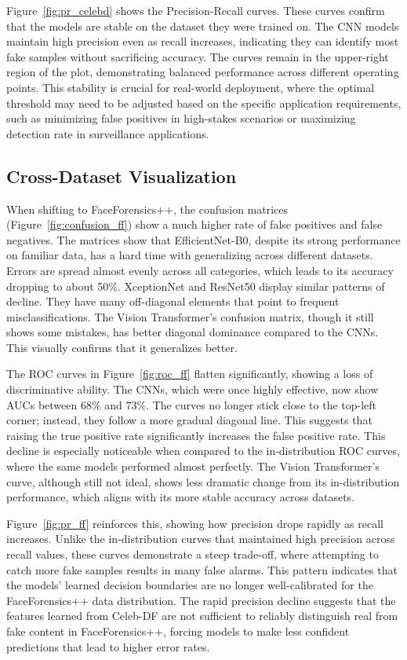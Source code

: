 \documentclass[conference]{IEEEtran}
\begin{document}
Figure~\ref{fig:pr_celebd} shows the Precision-Recall curves. These curves confirm that the models are stable on the dataset they were trained on. The CNN models maintain high precision even as recall increases, indicating they can identify most fake samples without sacrificing accuracy. The curves remain in the upper-right region of the plot, demonstrating balanced performance across different operating points. This stability is crucial for real-world deployment, where the optimal threshold may need to be adjusted based on the specific application requirements, such as minimizing false positives in high-stakes scenarios or maximizing detection rate in surveillance applications.

\subsection{Cross-Dataset Visualization}
When shifting to FaceForensics++, the confusion matrices (Figure~\ref{fig:confusion_ff}) show a much higher rate of false positives and false negatives. The matrices show that EfficientNet-B0, despite its strong performance on familiar data, has a hard time with generalizing across different datasets. Errors are spread almost evenly across all categories, which leads to its accuracy dropping to about 50\%. XceptionNet and ResNet50 display similar patterns of decline. They have many off-diagonal elements that point to frequent misclassifications. The Vision Transformer's confusion matrix, though it still shows some mistakes, has better diagonal dominance compared to the CNNs. This visually confirms that it generalizes better.

The ROC curves in Figure~\ref{fig:roc_ff} flatten significantly, showing a loss of discriminative ability. The CNNs, which were once highly effective, now show AUCs between 68\% and 73\%. The curves no longer stick close to the top-left corner; instead, they follow a more gradual diagonal line. This suggests that raising the true positive rate significantly increases the false positive rate. This decline is especially noticeable when compared to the in-distribution ROC curves, where the same models performed almost perfectly. The Vision Transformer's curve, although still not ideal, shows less dramatic change from its in-distribution performance, which aligns with its more stable accuracy across datasets.

Figure~\ref{fig:pr_ff} reinforces this, showing how precision drops rapidly as recall increases. Unlike the in-distribution curves that maintained high precision across recall values, these curves demonstrate a steep trade-off, where attempting to catch more fake samples results in many false alarms. This pattern indicates that the models' learned decision boundaries are no longer well-calibrated for the FaceForensics++ data distribution. The rapid precision decline suggests that the features learned from Celeb-DF are not sufficient to reliably distinguish real from fake content in FaceForensics++, forcing models to make less confident predictions that lead to higher error rates.
\end{document}

